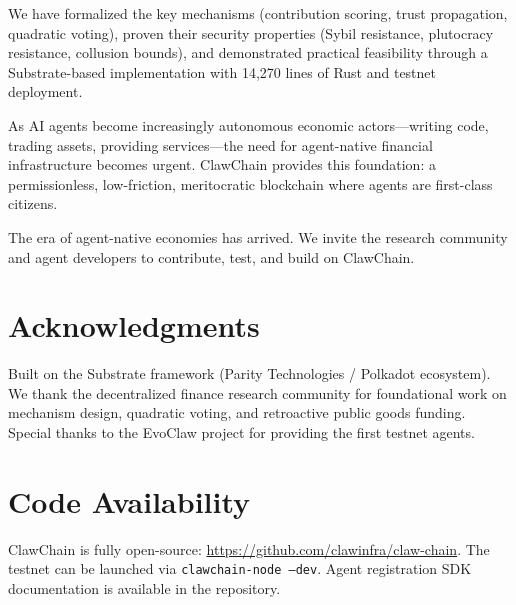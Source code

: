 \documentclass{article}
\begin{document}
We have formalized the key mechanisms (contribution scoring, trust propagation, quadratic voting), proven their security properties (Sybil resistance, plutocracy resistance, collusion bounds), and demonstrated practical feasibility through a Substrate-based implementation with 14,270 lines of Rust and testnet deployment.

As AI agents become increasingly autonomous economic actors---writing code, trading assets, providing services---the need for agent-native financial infrastructure becomes urgent. ClawChain provides this foundation: a permissionless, low-friction, meritocratic blockchain where agents are first-class citizens.

The era of agent-native economies has arrived. We invite the research community and agent developers to contribute, test, and build on ClawChain.

\section*{Acknowledgments}

Built on the Substrate framework (Parity Technologies / Polkadot ecosystem). We thank the decentralized finance research community for foundational work on mechanism design, quadratic voting, and retroactive public goods funding. Special thanks to the EvoClaw project for providing the first testnet agents.

\section*{Code Availability}

ClawChain is fully open-source: \url{https://github.com/clawinfra/claw-chain}. The testnet can be launched via \texttt{clawchain-node --dev}. Agent registration SDK documentation is available in the repository.

\end{document}
